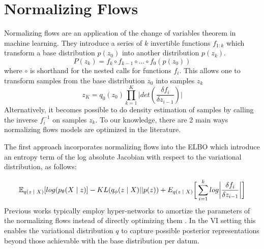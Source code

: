 \section{Normalizing Flows}

Normalizing flows are an application of the change of variables theorem in machine learning. They introduce a series of  $k$ invertible functions $f_{1:k}$ which transform a base distribution $p(z_{0})$ into another distribution $p(z_{k})$. 
\begin{equation}
P(z_{k}) = f_{k} \circ f_{k-1} \circ ... \circ f_{0}(p(z_{0}))
\end{equation} 
where $\circ$ is shorthand for the nested calls for functions $f_{i}$. This allows one to transform samples from the base distribution $z_{0}$ into samples $z_{k}$
\begin{equation}
	z_{K} = q_{0}(z_{0}) \prod_{k=1}^{K} \bigg|det (\frac{\delta f_{i}}{\delta z_{i-1}}) \bigg|
\end{equation}
Alternatively, it becomes possible to do density estimation of samples by calling the inverse $f_{i}^{-1}$ on samples $z_{k}$. To our knowledge, there are 2 main ways normalizing flows models are optimized in the literature. 




The first approach incorporates normalizing flows into the \ac{ELBO} which introduce an entropy term of the log absolute Jacobian with respect to the variational distribution, as follows:

\begin{equation}
\operatorname{\mathbb{E}}_{q(z \; | \;{X})} [ log(p_{\theta}(X \; | \;{z}) ]  - KL(q_{\phi}(z \; | \;{X}) || p(z)) + E_{q(z\; | \;{X})}\bigg[\sum_{i=1}^{k}log \bigg|\frac{\delta f_{i}}{\delta z_{i-1}}\bigg|\bigg]
\end{equation}
Previous works typically employ hyper-networks \cite{ha2016hypernets} to amortize the parameters of the normalizing flows instead of directly optimizing them  \cite{rezende2015VIwithNF,tomczak2016Householder,vdberg2018sylvester}. In the \ac{VI} setting this enables the variational distribution $q$ to capture possible posterior representations beyond those achievable with the base distribution per datum.

